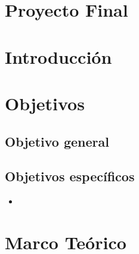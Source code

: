 \documentclass[12pt]{article}
\begin{document}
    

    \tableofcontents
    \newpage

    \section*{\centering Proyecto Final}
    \vspace{0.7cm}

    \section{Introducción}
        

    \newpage
    \section{Objetivos}
        \subsection{Objetivo general}
                        

        \subsection{Objetivos específicos}
            \begin{itemize}
                \item 
            \end{itemize}


    \newpage
    \section{Marco Teórico}
        \subsection{}
        \subsection{}
        \subsection{}
        \subsection{}
                        
\end{document}
